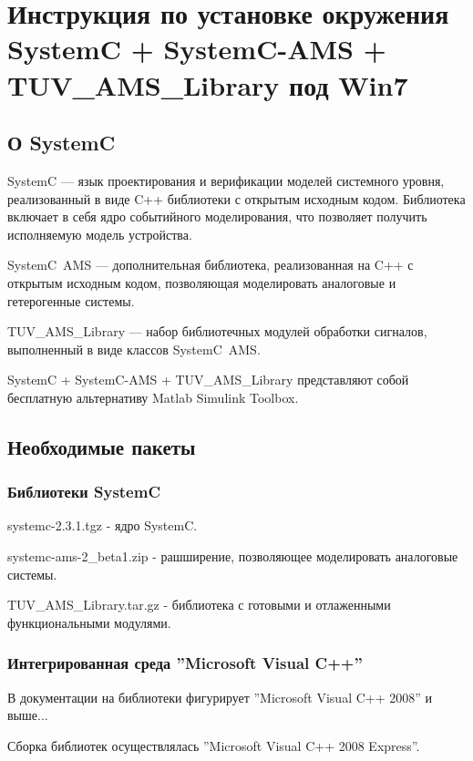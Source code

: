 \section{Инструкция по установке окружения SystemC + SystemC-AMS + TUV\_AMS\_Library под Win7}

\subsection{О SystemC}

SystemC — язык проектирования и верификации моделей системного уровня, реализованный в виде C++ библиотеки с открытым исходным кодом. Библиотека включает в себя ядро событийного моделирования, что позволяет получить исполняемую модель устройства.

SystemC~AMS — дополнительная библиотека, реализованная на C++ с открытым исходным кодом, позволяющая моделировать аналоговые и гетерогенные системы.

TUV\_AMS\_Library — набор библиотечных модулей обработки сигналов, выполненный в виде классов SystemC~AMS.

SystemC + SystemC-AMS + TUV\_AMS\_Library представляют собой бесплатную альтернативу Matlab Simulink Toolbox.


\subsection{Необходимые пакеты}

\subsubsection{Библиотеки SystemC}

systemc-2.3.1.tgz  - ядро SystemC.

systemc-ams-2\_beta1.zip - рашширение, позволяющее моделировать аналоговые системы.

TUV\_AMS\_Library.tar.gz - библиотека с готовыми и отлаженными функциональными модулями.


\subsubsection{Интегрированная среда ''Microsoft Visual C++''}

В документации на библиотеки фигурирует ''Microsoft Visual C++ 2008'' и выше...


Сборка библиотек осуществлялась ''Microsoft Visual C++ 2008 Express''.

